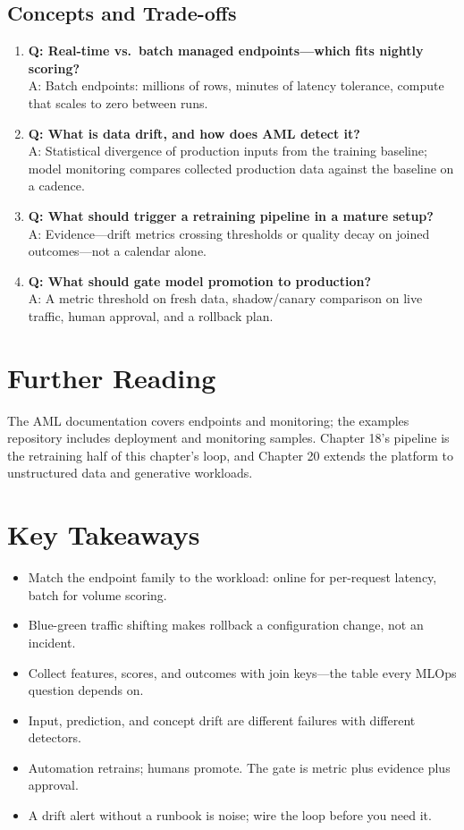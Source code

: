 \subsection{Concepts and Trade-offs}
\begin{enumerate}
    \item \textbf{Q: Real-time vs.\ batch managed endpoints---which fits nightly scoring?}\\
    A: Batch endpoints: millions of rows, minutes of latency tolerance, compute that scales to zero between runs.
    \item \textbf{Q: What is data drift, and how does AML detect it?}\\
    A: Statistical divergence of production inputs from the training baseline; model monitoring compares collected production data against the baseline on a cadence.
    \item \textbf{Q: What should trigger a retraining pipeline in a mature setup?}\\
    A: Evidence---drift metrics crossing thresholds or quality decay on joined outcomes---not a calendar alone.
    \item \textbf{Q: What should gate model promotion to production?}\\
    A: A metric threshold on fresh data, shadow/canary comparison on live traffic, human approval, and a rollback plan.
\end{enumerate}

\section{Further Reading}
The AML documentation \cite{microsoft2025azureml} covers endpoints and monitoring; the examples repository \cite{microsoft2025azuremlExamples} includes deployment and monitoring samples. Chapter 18's pipeline \cite{microsoft2025amlPipelines} is the retraining half of this chapter's loop, and Chapter 20 extends the platform to unstructured data and generative workloads.

\section*{Key Takeaways}
\begin{itemize}
    \item Match the endpoint family to the workload: online for per-request latency, batch for volume scoring.
    \item Blue-green traffic shifting makes rollback a configuration change, not an incident.
    \item Collect features, scores, and outcomes with join keys---the table every MLOps question depends on.
    \item Input, prediction, and concept drift are different failures with different detectors.
    \item Automation retrains; humans promote. The gate is metric plus evidence plus approval.
    \item A drift alert without a runbook is noise; wire the loop before you need it.
\end{itemize}

